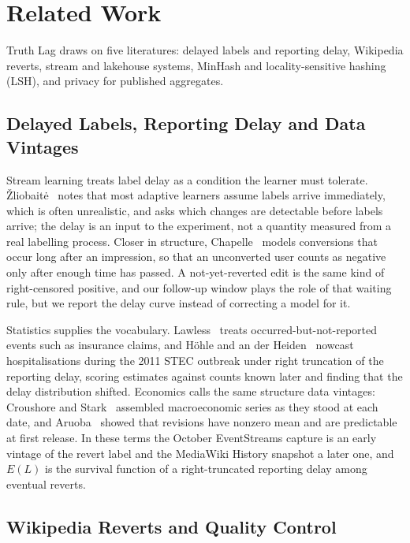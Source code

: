 \section{Related Work}
\label{sec:related}

Truth Lag draws on five literatures: delayed labels and reporting delay, Wikipedia reverts, stream and lakehouse systems, MinHash and locality-sensitive hashing (LSH), and privacy for published aggregates.

\subsection{Delayed Labels, Reporting Delay and Data Vintages}

Stream learning treats label delay as a condition the learner must tolerate. \v{Z}liobait\.{e}~\cite{D02_zliobaite2010} notes that most adaptive learners assume labels arrive immediately, which is often unrealistic, and asks which changes are detectable before labels arrive; the delay is an input to the experiment, not a quantity measured from a real labelling process. Closer in structure, Chapelle~\cite{D12_chapelle2014} models conversions that occur long after an impression, so that an unconverted user counts as negative only after enough time has passed. A not-yet-reverted edit is the same kind of right-censored positive, and our follow-up window plays the role of that waiting rule, but we report the delay curve instead of correcting a model for it.

Statistics supplies the vocabulary. Lawless~\cite{D18_lawless1994} treats occurred-but-not-reported events such as insurance claims, and H\"ohle and an der Heiden~\cite{D17_hohle2014} nowcast hospitalisations during the 2011 STEC outbreak under right truncation of the reporting delay, scoring estimates against counts known later and finding that the delay distribution shifted. Economics calls the same structure data vintages: Croushore and Stark~\cite{D20_croushore2001} assembled macroeconomic series as they stood at each date, and Aruoba~\cite{D21_aruoba2008} showed that revisions have nonzero mean and are predictable at first release. In these terms the October EventStreams capture is an early vintage of the revert label and the MediaWiki History snapshot a later one, and $E(L)$ is the survival function of a right-truncated reporting delay among eventual reverts.

\subsection{Wikipedia Reverts and Quality Control}


